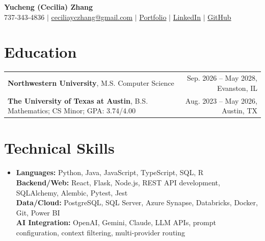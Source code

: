 \documentclass[letterpaper,10pt]{article}
\begin{document}
\begin{center}
{\Large\textbf{Yucheng (Cecilia) Zhang}}\\[-1pt]
\small 737-343-4836 $|$ \href{mailto:ceciliayczhang@gmail.com}{ceciliayczhang@gmail.com} $|$
\href{https://yczhangcc.github.io/yuchengzhang_portfolio/}{Portfolio} $|$
\href{https://www.linkedin.com/in/yczcecilia/}{LinkedIn} $|$
\href{https://github.com/yczhangcc}{GitHub}
\end{center}
\vspace{-8pt}

\section{Education}
{\small
\begin{tabular*}{0.985\textwidth}[t]{l@{\extracolsep{\fill}}r}
\textbf{Northwestern University}, M.S. Computer Science & Sep. 2026 -- May 2028, Evanston, IL \\
\textbf{The University of Texas at Austin}, B.S. Mathematics; CS Minor; GPA: 3.74/4.00 & Aug. 2023 -- May 2026, Austin, TX \\
\end{tabular*}}
\vspace{-5pt}

\section{Technical Skills}
\begin{itemize}[leftmargin=0.11in,label={},topsep=1pt,itemsep=0pt]
\footnotesize\item{
\textbf{Languages:} Python, Java, JavaScript, TypeScript, SQL, R \\
\textbf{Backend/Web:} React, Flask, Node.js, REST API development, SQLAlchemy, Alembic, Pytest, Jest \\
\textbf{Data/Cloud:} PostgreSQL, SQL Server, Azure Synapse, Databricks, Docker, Git, Power BI \\
\textbf{AI Integration:} OpenAI, Gemini, Claude, LLM APIs, prompt configuration, context filtering, multi-provider routing
}
\end{itemize}
\vspace{-7pt}
\end{document}

